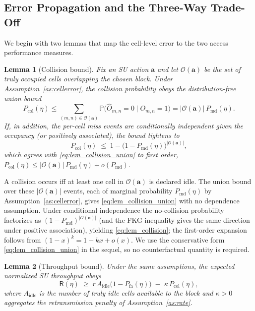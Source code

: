 \documentclass[journal]{IEEEtran}
\newtheorem{lemma}{Lemma}
\newcommand{\Prob}{\mathbb{P}}
\newcommand{\occ}{O}                       %
\newcommand{\Pmd}{P_{\mathrm{md}}}         %
\newcommand{\Pfa}{P_{\mathrm{fa}}}         %
\newcommand{\thr}{\eta}                    %
\newcommand{\act}{\bm{a}}                  %
\newcommand{\Pcol}{P_{\mathrm{col}}}       %
\newcommand{\thru}{\mathsf{R}}             %
\begin{document}
\subsection{Error Propagation and the Three-Way Trade-Off}
\label{subsec:thmA}

We begin with two lemmas that map the cell-level error to the two access
performance measures.

\begin{lemma}[Collision bound]
\label{lem:collision}
Fix an SU action $\act$ and let $\mathcal{O}(\act)$ be the set of truly
occupied cells overlapping the chosen block. Under
Assumption~\ref{as:cellerror}, the collision probability obeys the
distribution-free union bound
\begin{equation}
\Pcol(\thr)\le\!\!\sum_{(m,n)\in\mathcal{O}(\act)}\!\!
\Prob\big(\hat\occ_{m,n}{=}0\mid \occ_{m,n}{=}1\big)
=|\mathcal{O}(\act)|\,\Pmd(\thr).
\label{eq:lem_collision_union}
\end{equation}
If, in addition, the per-cell miss events are conditionally independent given
the occupancy (or positively associated), the bound tightens to
\begin{equation}
\Pcol(\thr)\;\le\;1-\bigl(1-\Pmd(\thr)\bigr)^{|\mathcal{O}(\act)|},
\label{eq:lem_collision}
\end{equation}
which agrees with \eqref{eq:lem_collision_union} to first order,
$\Pcol(\thr)\le|\mathcal{O}(\act)|\,\Pmd(\thr)+o(\Pmd)$.
\end{lemma}

\begin{IEEEproof}
A collision occurs iff at least one cell in $\mathcal{O}(\act)$ is declared
idle. The union bound over these $|\mathcal{O}(\act)|$ events, each of
marginal probability $\Pmd(\thr)$ by Assumption~\ref{as:cellerror}, gives
\eqref{eq:lem_collision_union} with no dependence assumption. Under
conditional independence the no-collision probability factorizes as
$(1-\Pmd)^{|\mathcal{O}(\act)|}$ (and the FKG inequality gives the same
direction under positive association), yielding \eqref{eq:lem_collision};
the first-order expansion follows from $(1-x)^{k}=1-kx+o(x)$. We use the
conservative form \eqref{eq:lem_collision_union} in the sequel, so no
counterfactual quantity is required.
\end{IEEEproof}

\begin{lemma}[Throughput bound]
\label{lem:throughput}
Under the same assumptions, the expected normalized SU throughput obeys
\begin{equation}
\thru(\thr) \;\ge\; \bar{r}\,A_{\mathrm{idle}}\bigl(1-\Pfa(\thr)\bigr)
\;-\; \kappa\,\Pcol(\thr),
\label{eq:lem_throughput}
\end{equation}
where $A_{\mathrm{idle}}$ is the number of truly idle cells available to the
block and $\kappa>0$ aggregates the retransmission penalty of
Assumption~\ref{as:rate}.
\end{lemma}
\end{document}

